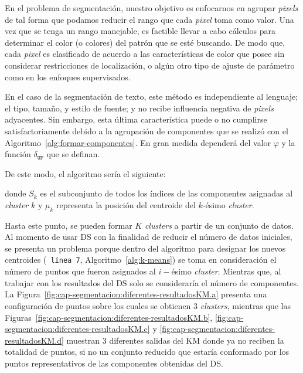 En el problema de segmentación, nuestro objetivo es enfocarnos en agrupar 
\textit{pixels} de tal forma que podamos reducir el rango que cada \textit{pixel} toma 
como valor. Una vez que se tenga un rango manejable, es factible llevar a cabo 
cálculos para determinar el color (o colores) del patrón que se esté buscando. 
De modo que, cada \textit{pixel} es clasificado de acuerdo a las características 
de color que posee sin considerar restricciones de localización, o algún otro 
tipo de ajuste de parámetro como en los enfoques supervisados.

En el caso de la segmentación de texto, este método es independiente al 
lenguaje; el tipo, tamaño, y estilo de fuente; y no recibe influencia 
negativa de \textit{pixels} adyacentes. Sin embargo, esta última característica
puede o no cumplirse satisfactoriamente debido a la agrupación de componentes 
que se realizó con el Algoritmo~\ref{alg:formar-componentes}. En gran medida 
dependerá del valor $\varphi$ y la función $\delta_{\mathtt{UF}}$ que se 
definan.

De este modo, el algoritmo sería el siguiente:

donde  $S_k$ es el subconjunto de todos los índices de las componentes asignadas
 al \textit{cluster} $k$ y $\mu_k$ representa la posición del centroide del 
 $k$-ésimo \textit{cluster}.

Hasta este punto, se pueden formar $K$ \textit{clusters} a partir de un conjunto 
de datos. Al momento de usar DS con la finalidad de reducir el número de datos 
iniciales, se presenta un problema porque dentro del algoritmo para designar los 
nuevos centroides (\texttt{\color{gray} línea 7}, Algoritmo~\ref{alg:k-means}) 
se toma en consideración el número de puntos que fueron asignados al $i-$ésimo 
\textit{cluster}. Mientras que, al trabajar con los resultados del DS solo se
 consideraría el número de componentes. La 
 Figura~\ref{fig:cap-segmentacion:diferentes-resultadosKM.a} presenta una 
 configuración de puntos sobre los cuales se obtienen 3 \textit{clusters},
  mientras que las Figuras~\ref{fig:cap-segmentacion:diferentes-resultadosKM.b}, 
  \ref{fig:cap-segmentacion:diferentes-resultadosKM.c} y 
  \ref{fig:cap-segmentacion:diferentes-resultadosKM.d} muestran 3 diferentes 
  salidas del KM donde ya no reciben la totalidad de puntos, si no un conjunto 
  reducido que estaría conformado por los puntos representativos de las 
  componentes obtenidas del DS.

